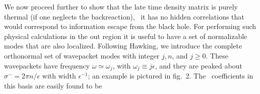 We now proceed further to show that the late time density matrix is purely
thermal (if one neglects the backreaction), \ie\ it has no hidden
correlations that would correspond to
information escape from the black hole.
For performing such physical calculations in the out region it is
useful to have a set of normalizable modes that are also
localized.  Following
Hawking, we introduce the complete
orthonormal set of wavepacket modes
%
\eqn{}
%
with integer $j,n$, and $j \ge 0$.
These wavepackets have frequency $\omega\simeq
\omega_j$, with $\omega_{j}\equiv j\epsilon$, and they are
peaked about $\sigma^{-}={2\pi n/\epsilon}$ with width $\epsilon^{-1}$; an
example is pictured in fig.~2.
The \Bog\ coefficients in this basis are easily found to be
%
\eqn{}
%



